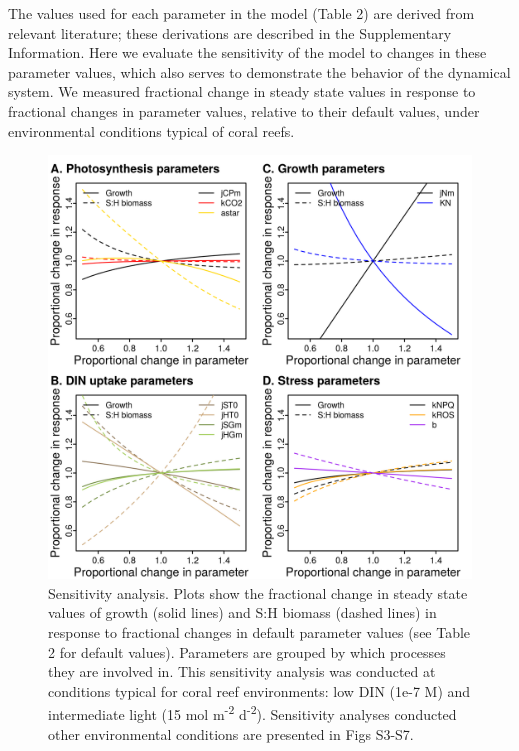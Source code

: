 \documentclass[]{elsarticle} %
\makeatletter
\def\maxwidth{\ifdim\Gin@nat@width>\linewidth\linewidth
\else\Gin@nat@width\fi}
\let\Oldincludegraphics\includegraphics
\renewcommand{\includegraphics}[1]{\Oldincludegraphics[width=\maxwidth]{#1}}
\makeatother
\begin{document}
The values used for each parameter in the model (Table 2) are derived
from relevant literature; these derivations are described in the
Supplementary Information. Here we evaluate the sensitivity of the model
to changes in these parameter values, which also serves to demonstrate
the behavior of the dynamical system. We measured fractional change in
steady state values in response to fractional changes in parameter
values, relative to their default values, under environmental conditions
typical of coral reefs.

\begin{figure}[htbp]
\centering
\includegraphics{../img/Fig4.png}
\caption{Sensitivity analysis. Plots show the fractional change in
steady state values of growth (solid lines) and S:H biomass (dashed
lines) in response to fractional changes in default parameter values
(see Table 2 for default values). Parameters are grouped by which
processes they are involved in. This sensitivity analysis was conducted
at conditions typical for coral reef environments: low DIN (1e-7 M) and
intermediate light (15 mol m\textsuperscript{-2} d\textsuperscript{-2}).
Sensitivity analyses conducted other environmental conditions are
presented in Figs S3-S7.}
\end{figure}
\end{document}
